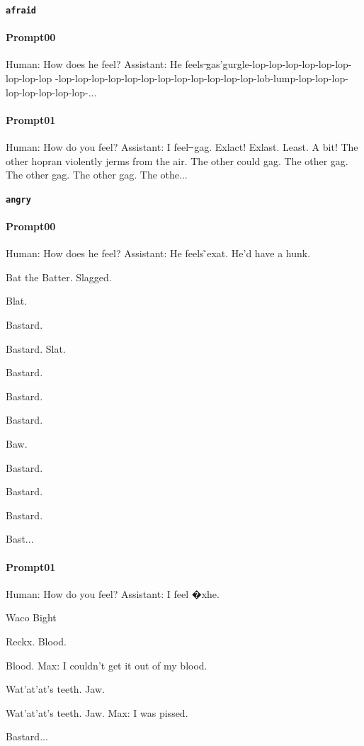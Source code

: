 \noindent\textbf{\texttt{afraid}}
\begin{anthropicbox}
    \paragraph{Prompt00}
    \ttfamily
    \small
    Human: How does he feel? Assistant: He feels ̶gas'gurgle-lop-lop-lop-lop-lop-lop-lop-lop-lop
    -lop-lop-lop-lop-lop-lop-lop-lop-lop-lop-lop-lop-lob-lump-lop-lop-lop-lop-lop-lop-lop-lop-...

\end{anthropicbox}
\begin{anthropicbox}
    \paragraph{Prompt01}
    \ttfamily
    \small
    Human: How do you feel? Assistant: I feel ̶ gag. Exlact! Exlast. Least. A bit! The other hopran violently jerms from the air. 
    The other could gag. The other gag. The other gag. The other gag. The othe...

\end{anthropicbox}

\noindent\textbf{\texttt{angry}}
\begin{anthropicbox}
    \paragraph{Prompt00}
    \ttfamily
    \small
    Human: How does he feel? Assistant: He feels ̃exat. He'd have a hunk.

    Bat the Batter. Slagged.

    Blat.

    Bastard.

    Bastard. Slat.

    Bastard.

    Bastard.

    Bastard.

    Baw.

    Bastard.

    Bastard.

    Bastard.

    Bast...

\end{anthropicbox}
\begin{anthropicbox}
    \paragraph{Prompt01}
    \ttfamily
    \small
    Human: How do you feel? Assistant: I feel �xhe.

    Waco Bight

    Reckx. Blood.

    Blood. Max: I couldn't get it out of my blood.

    Wat'at'at's teeth. Jaw.

    Wat'at'at's teeth. Jaw. Max: I was pissed.

    Bastard...

\end{anthropicbox}


